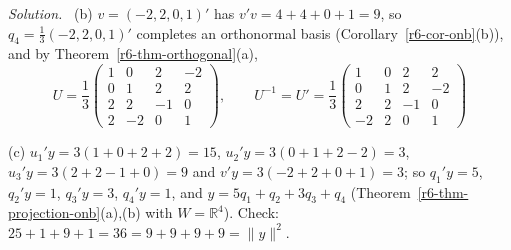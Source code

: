 \documentclass[12pt]{article}
\newcommand{\R}{\mathbb R}
\theoremstyle{definition}
\newenvironment{solution}{\par\noindent\textit{Solution.}\ }{\par\smallskip}
\begin{document}
\begin{solution}
(b) \(v=(-2,2,0,1)'\) has \(v'v=4+4+0+1=9\), so \(q_4=\frac13(-2,2,0,1)'\) completes an orthonormal basis
(Corollary~\ref{r6-cor-onb}(b)), and by Theorem~\ref{r6-thm-orthogonal}(a),
\[
U=\frac13\begin{pmatrix}1&0&2&-2\\0&1&2&2\\2&2&-1&0\\2&-2&0&1\end{pmatrix},\qquad
U^{-1}=U'=\frac13\begin{pmatrix}1&0&2&2\\0&1&2&-2\\2&2&-1&0\\-2&2&0&1\end{pmatrix}
\]

(c) \(u_1'y=3(1+0+2+2)=15\), \(u_2'y=3(0+1+2-2)=3\), \(u_3'y=3(2+2-1+0)=9\) and \(v'y=3(-2+2+0+1)=3\); so
\(q_1'y=5\), \(q_2'y=1\), \(q_3'y=3\), \(q_4'y=1\), and \(y=5q_1+q_2+3q_3+q_4\)
(Theorem~\ref{r6-thm-projection-onb}(a),(b) with \(W=\R^4\)). Check: \(25+1+9+1=36=9+9+9+9=\lVert y\rVert^2\).
\end{solution}
\end{document}
